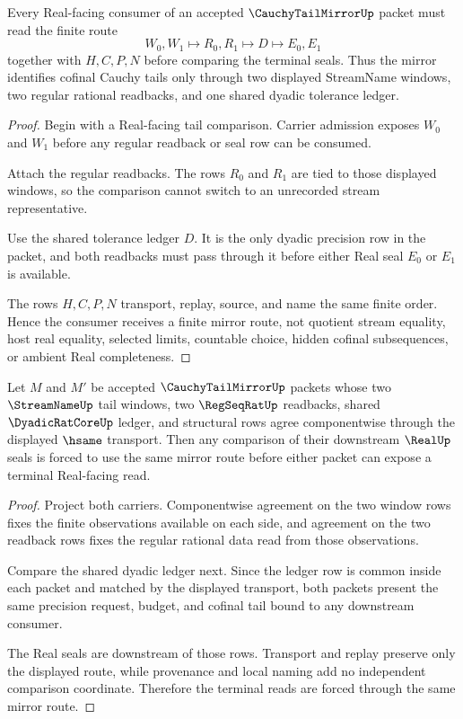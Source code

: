 \begin{theorem}
\label{thm:cauchy-tail-mirror-shared-tolerance-handoff}
Every Real-facing consumer of an accepted $\CauchyTailMirrorUp$ packet must read the finite route
$$
W_0,W_1 \longmapsto R_0,R_1 \longmapsto D \longmapsto E_0,E_1
$$
together with $H,C,P,N$ before comparing the terminal seals. Thus the mirror identifies cofinal Cauchy tails only through two displayed StreamName windows, two regular rational readbacks, and one shared dyadic tolerance ledger.
\end{theorem}
\begin{proof}
Begin with a Real-facing tail comparison. Carrier admission exposes $W_0$ and $W_1$ before any regular readback or seal row can be consumed.

Attach the regular readbacks. The rows $R_0$ and $R_1$ are tied to those displayed windows, so the comparison cannot switch to an unrecorded stream representative.

Use the shared tolerance ledger $D$. It is the only dyadic precision row in the packet, and both readbacks must pass through it before either Real seal $E_0$ or $E_1$ is available.

The rows $H,C,P,N$ transport, replay, source, and name the same finite order. Hence the consumer receives a finite mirror route, not quotient stream equality, host real equality, selected limits, countable choice, hidden cofinal subsequences, or ambient Real completeness.
\end{proof}

\begin{theorem}
\label{thm:cauchy-tail-mirror-componentwise-determinacy}
Let $M$ and $M'$ be accepted $\CauchyTailMirrorUp$ packets whose two $\StreamNameUp$ tail windows, two $\RegSeqRatUp$ readbacks, shared $\DyadicRatCoreUp$ ledger, and structural rows agree componentwise through the displayed $\hsame$ transport. Then any comparison of their downstream $\RealUp$ seals is forced to use the same mirror route before either packet can expose a terminal Real-facing read.
\end{theorem}
\begin{proof}
Project both carriers. Componentwise agreement on the two window rows fixes the finite observations available on each side, and agreement on the two readback rows fixes the regular rational data read from those observations.

Compare the shared dyadic ledger next. Since the ledger row is common inside each packet and matched by the displayed transport, both packets present the same precision request, budget, and cofinal tail bound to any downstream consumer.

The Real seals are downstream of those rows. Transport and replay preserve only the displayed route, while provenance and local naming add no independent comparison coordinate. Therefore the terminal reads are forced through the same mirror route.
\end{proof}

